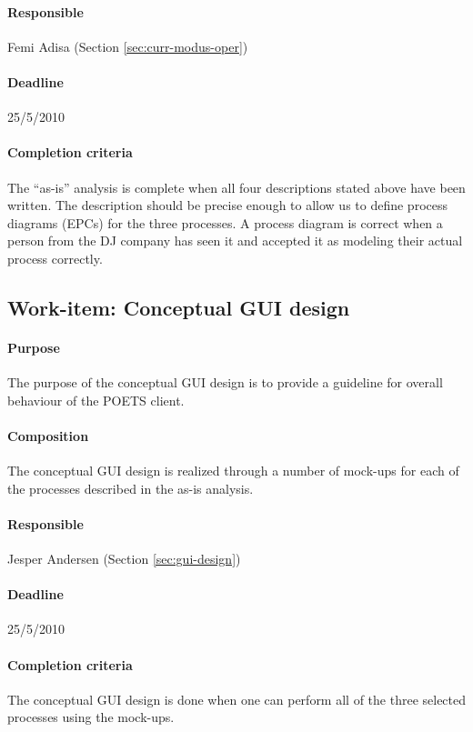 \documentclass[envcountsame]{llncs}
\begin{document}
\paragraph{Responsible} Femi Adisa (Section \ref{sec:curr-modus-oper})
\paragraph{Deadline} 25/5/2010
\paragraph{Completion criteria} The ``as-is'' analysis is complete
when all four descriptions stated above have been written. The
description should be precise enough to allow us to define process
diagrams (EPCs) for the three processes. A process diagram is correct
when a person from the DJ company has seen it and accepted it as
modeling their actual process correctly.

\subsection*{Work-item: Conceptual GUI design}
\paragraph{Purpose} The purpose of the conceptual GUI design is to
provide a guideline for overall behaviour of the POETS client.

\paragraph{Composition} The conceptual GUI design is realized through
a number of mock-ups for each of the processes described in the as-is
analysis.

\paragraph{Responsible} Jesper Andersen (Section \ref{sec:gui-design})

\paragraph{Deadline} 25/5/2010

\paragraph{Completion criteria} The conceptual GUI design is done when
one can perform all of the three selected processes using the
mock-ups. 
\end{document}
